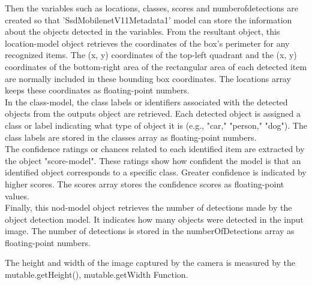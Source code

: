 \documentclass[MScCS]{uccthesis}
\begin{document}
    
Then the variables such as locations, classes, scores and numberofdetections are created so that 'SsdMobilenetV11Metadata1' model can store the information about the objects detected in the variables. From the resultant object, this location-model object retrieves the coordinates of the box's perimeter for any recognized items. The (x, y) coordinates of the top-left quadrant and the (x, y) coordinates of the bottom-right area of the rectangular area of each detected item are normally included in these bounding box coordinates. The locations array keeps these coordinates as floating-point numbers. 
\\In the class-model, the class labels or identifiers associated with the detected objects from the outputs object are retrieved. Each detected object is assigned a class or label indicating what type of object it is (e.g., "car," "person," "dog"). The class labels are stored in the classes array as floating-point numbers.
\\The confidence ratings or chances related to each identified item are extracted by the object "score-model". These ratings show how confident the model is that an identified object corresponds to a specific class. Greater confidence is indicated by higher scores. The scores array stores the confidence scores as floating-point values.
\\Finally, this nod-model object retrieves the number of detections made by the object detection model. It indicates how many objects were detected in the input image. The number of detections is stored in the numberOfDetections array as floating-point numbers.


The height and width of the image captured by the camera is measured by the mutable.getHeight(), mutable.getWidth Function.
\end{document}
